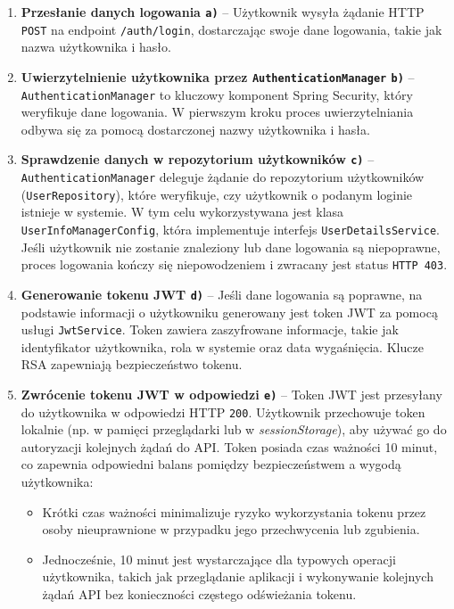 \begin{enumerate}
    \item \textbf{Przesłanie danych logowania \texttt{a)}} -- Użytkownik wysyła żądanie HTTP \texttt{POST} na endpoint \texttt{/auth/login}, dostarczając swoje dane logowania, takie jak nazwa użytkownika i hasło. 
		
    \item \textbf{Uwierzytelnienie użytkownika przez \texttt{AuthenticationManager} \texttt{b)}} -- \texttt{AuthenticationManager} to kluczowy komponent Spring Security, który weryfikuje dane logowania. W pierwszym kroku proces uwierzytelniania odbywa się za pomocą dostarczonej nazwy użytkownika i hasła.

    \item \textbf{Sprawdzenie danych w repozytorium użytkowników \texttt{c)}} -- \texttt{AuthenticationManager} deleguje żądanie do repozytorium użytkowników (\texttt{UserRepository}), które weryfikuje, czy użytkownik o podanym loginie istnieje w systemie. W tym celu wykorzystywana jest klasa \texttt{UserInfoManagerConfig}, która implementuje interfejs \texttt{UserDetailsService}. Jeśli użytkownik nie zostanie znaleziony lub dane logowania są niepoprawne, proces logowania kończy się niepowodzeniem i zwracany jest status \texttt{HTTP 403}.

    \item \textbf{Generowanie tokenu JWT \texttt{d)}} -- Jeśli dane logowania są poprawne, na podstawie informacji o użytkowniku generowany jest token JWT za pomocą usługi \texttt{JwtService}. Token zawiera zaszyfrowane informacje, takie jak identyfikator użytkownika, rola w systemie oraz data wygaśnięcia. Klucze RSA zapewniają bezpieczeństwo tokenu.

    \item \textbf{Zwrócenie tokenu JWT w odpowiedzi \texttt{e)}} -- Token JWT jest przesyłany do użytkownika w odpowiedzi HTTP \texttt{200}. Użytkownik przechowuje token lokalnie (np. w pamięci przeglądarki lub w \emph{sessionStorage}), aby używać go do autoryzacji kolejnych żądań do API. Token posiada czas ważności 10 minut, co zapewnia odpowiedni balans pomiędzy bezpieczeństwem a wygodą użytkownika:
\begin{itemize}
    \item Krótki czas ważności minimalizuje ryzyko wykorzystania tokenu przez osoby nieuprawnione w przypadku jego przechwycenia lub zgubienia.
    \item Jednocześnie, 10 minut jest wystarczające dla typowych operacji użytkownika, takich jak przeglądanie aplikacji i wykonywanie kolejnych żądań API bez konieczności częstego odświeżania tokenu.
\end{itemize}
 
\end{enumerate}

